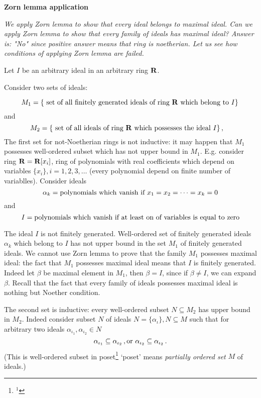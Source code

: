 
\def\R {{\bf R}}
\def\Z {{\bf Z}}
\def\a {\alpha}




   \centerline {\bf Zorn lemma application}

{\it
  We apply Zorn lemma to show that every ideal belongs to maximal ideal.
Can we apply Zorn lemma to show that every family of ideals
has maximal ideal?  Answer is: "No" since positive answer means that ring is 
noetherian. Let us see how conditions of applying Zorn lemma are failed.}


  Let $I$ be an arbitrary ideal in an arbitrary ring $\R$.

   Consider two sets of ideals:

      $$
   M_1=\{\hbox{
set of all finitely generated ideals of ring $\R$ which 
belong to $I$}\}\,
      $$
and
      $$
   M_2=\{\hbox{
set of all ideals of ring $\R$ which possesses the ideal $I$}\}\,,\quad
      $$
 The first set for not-Noetherian rings is not inductive: it may happen
that $M_1$ possesses
well-ordered subset which has not upper bound in $M_1$.
E.g.  consider ring $\R=\R[x_i]$, 
ring of polynomials with real coefficients
which depend on variables 
$\{x_i\}, i=1,2,3,\dots$ 
(every polynomial depend on finite number of variablles). Consider ideals
   $$
  \a_k=\hbox {polynomials which vanish if $x_1=x_2=\dots=x_k=0$}
   $$
and
      $$
   I=\hbox{polynomials which vanish if at least on of variables is 
equal to zero}
      $$

 The ideal $I$ is not finitely generated. Well-ordered 
set of finitely generated
ideals $\a_k$ which belong to $I$ has not upper bound
in the set $M_1$ of finitely generated ideals. We cannot use Zorn lemma
to prove that the family $M_1$ possesses maximal ideal:
the fact that $M_1$ possesses maximal ideal means that $I$ is finitely 
generated. Indeed let $\beta$ be maximal element in $M_1$, then $\beta=I$,
since if $\beta\not=I$, we can expand $\beta$. 
{Recall that the fact that every family of ideals possesses maximal ideal
is nothing but Noether condition.}




  The second set is inductive: every well-ordered subset $N\subseteq M_2$
has upper bound in $M_2$. Indeed consider subset $N$
 of ideals $N=\{\a_\iota\}, N\subseteq M$
such that for arbitrary two ideals $\a_{\iota_1},\a_{\iota_2}\in N$
              $$
        \a_{\iota_1}\subseteq \a_{\iota_2}\,,{\rm or}\,\,
        \a_{\iota_2}\subseteq \a_{\iota_2}\,.
              $$
(This is well-ordered subset in poset\footnote{$^{1}$}
  {`poset' means {\it partially ordered set}} $M$ of ideals.)

